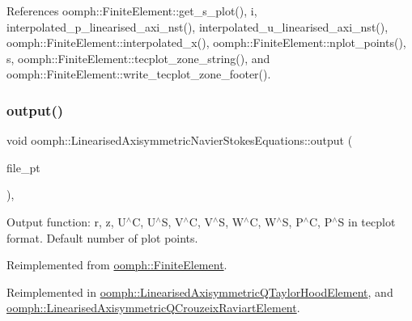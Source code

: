 References oomph\+::\+Finite\+Element\+::get\+\_\+s\+\_\+plot(), i, interpolated\+\_\+p\+\_\+linearised\+\_\+axi\+\_\+nst(), interpolated\+\_\+u\+\_\+linearised\+\_\+axi\+\_\+nst(), oomph\+::\+Finite\+Element\+::interpolated\+\_\+x(), oomph\+::\+Finite\+Element\+::nplot\+\_\+points(), s, oomph\+::\+Finite\+Element\+::tecplot\+\_\+zone\+\_\+string(), and oomph\+::\+Finite\+Element\+::write\+\_\+tecplot\+\_\+zone\+\_\+footer().

\mbox{\label{classoomph_1_1LinearisedAxisymmetricNavierStokesEquations_a11528829faa67968adcb46ad7cfa1fb2}} 
\subsubsection{\texorpdfstring{output()}{output()}\hspace{0.1cm}{\footnotesize\ttfamily [3/4]}}
{\footnotesize\ttfamily void oomph\+::\+Linearised\+Axisymmetric\+Navier\+Stokes\+Equations\+::output (\begin{DoxyParamCaption}\item[{F\+I\+LE $\ast$}]{file\+\_\+pt }\end{DoxyParamCaption})\hspace{0.3cm}{\ttfamily [inline]}, {\ttfamily [virtual]}}



Output function\+: r, z, U$^\wedge$C, U$^\wedge$S, V$^\wedge$C, V$^\wedge$S, W$^\wedge$C, W$^\wedge$S, P$^\wedge$C, P$^\wedge$S in tecplot format. Default number of plot points. 



Reimplemented from \hyperlink{classoomph_1_1FiniteElement_a72cddd09f8ddbee1a20a1ff404c6943e}{oomph\+::\+Finite\+Element}.



Reimplemented in \hyperlink{classoomph_1_1LinearisedAxisymmetricQTaylorHoodElement_ae6f718cf66bb753eccb3393c03ecfc4f}{oomph\+::\+Linearised\+Axisymmetric\+Q\+Taylor\+Hood\+Element}, and \hyperlink{classoomph_1_1LinearisedAxisymmetricQCrouzeixRaviartElement_a36138cdd6b03f179d648edeb0b0b31e1}{oomph\+::\+Linearised\+Axisymmetric\+Q\+Crouzeix\+Raviart\+Element}.



